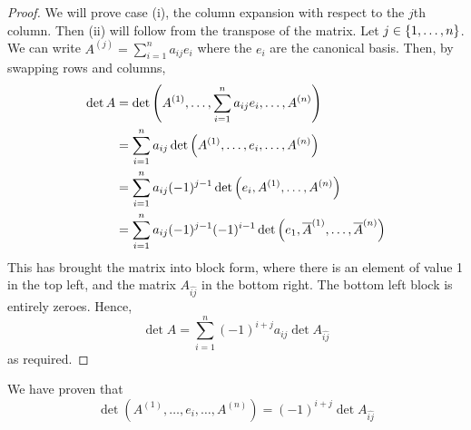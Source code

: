 \begin{proof}
	We will prove case (i), the column expansion with respect to the \( j \)th column.
	Then (ii) will follow from the transpose of the matrix.
	Let \( j \in \qty{1, \dots, n} \).
	We can write \( A^{(j)} = \sum_{i=1}^n a_{ij} e_i \) where the \( e_i \) are the canonical basis.
	Then, by swapping rows and columns,
	\begin{align*}
		\det A & = \det\qty(A^{(1)}, \dots, \sum_{i=1}^n a_{ij} e_i, \dots, A^{(n)})                                    \\
		       & = \sum_{i=1}^n a_{ij} \det\qty(A^{(1)}, \dots, e_i, \dots, A^{(n)})                                    \\
		       & = \sum_{i=1}^n a_{ij} (-1)^{j-1} \det\qty(e_i, A^{(1)}, \dots, A^{(n)})                                \\
		       & = \sum_{i=1}^n a_{ij} (-1)^{j-1} (-1)^{i-1} \det\qty(e_1, \overline A^{(1)}, \dots, \overline A^{(n)})
	\end{align*}
	This has brought the matrix into block form, where there is an element of value 1 in the top left, and the matrix \( A_{\widehat{ij}} \) in the bottom right.
	The bottom left block is entirely zeroes.
	Hence,
	\[
		\det A = \sum_{i=1}^n (-1)^{i+j} a_{ij} \det A_{\widehat{ij}}
	\]
	as required.
\end{proof}
\begin{remark}
	We have proven that
	\[
		\det (A^{(1)}, \dots, e_i, \dots, A^{(n)}) = (-1)^{i+j} \det A_{\widehat{ij}}
	\]
\end{remark}

